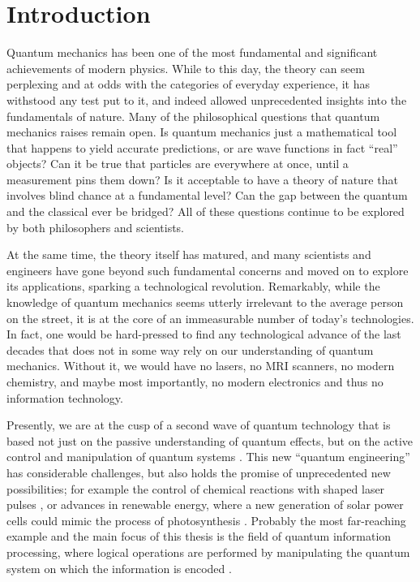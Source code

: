\chapter{Introduction}
\label{chap:intro}

Quantum mechanics has been one of the most fundamental and significant
achievements of modern physics. While to this day, the theory can seem
perplexing and at odds with the categories of everyday experience, it has
withstood any test put to it, and indeed allowed unprecedented insights into the
fundamentals of nature. Many of the philosophical questions that quantum
mechanics raises remain open. Is quantum mechanics just a mathematical tool
that happens to yield accurate predictions, or are wave functions in fact
``real'' objects?  Can it be true that particles are everywhere at once, until
a measurement pins them down? Is it acceptable to have a theory of nature that
involves blind chance at a fundamental level? Can the gap between the quantum
and the classical ever be bridged? All of these questions continue to be
explored by both philosophers and scientists.

At the same time, the theory itself has matured, and many scientists and
engineers have gone beyond such fundamental concerns and moved on to explore its
applications, sparking a technological revolution. Remarkably, while the
knowledge of quantum mechanics seems utterly irrelevant to the average person on
the street, it is at the core of an immeasurable number of today's technologies.
In fact, one would be hard-pressed to find any technological advance of the last
decades that does not in some way rely on our understanding of quantum
mechanics.  Without it, we would have no lasers, no MRI scanners, no modern
chemistry, and maybe most importantly, no modern electronics and thus no
information technology.

Presently, we are at the cusp of a second wave of quantum technology that is
based not just on the passive understanding of quantum effects, but on the
active control and manipulation of quantum systems \cite{DowlingPTRSA2003}.
This new ``quantum engineering'' has considerable challenges, but also holds the
promise of unprecedented new possibilities; for example the
control of chemical reactions with shaped laser pulses
\cite{BrumerShapiro}, or advances in renewable energy, where a new generation of
solar power cells could mimic the process of photosynthesis
\cite{ColliniScience09, SarovarNatPhys10}.  Probably the most far-reaching
example and the main focus of this thesis is the field of quantum information
processing, where logical operations are performed by manipulating the quantum
system on which the information is encoded \cite{NielsenChuang}.

